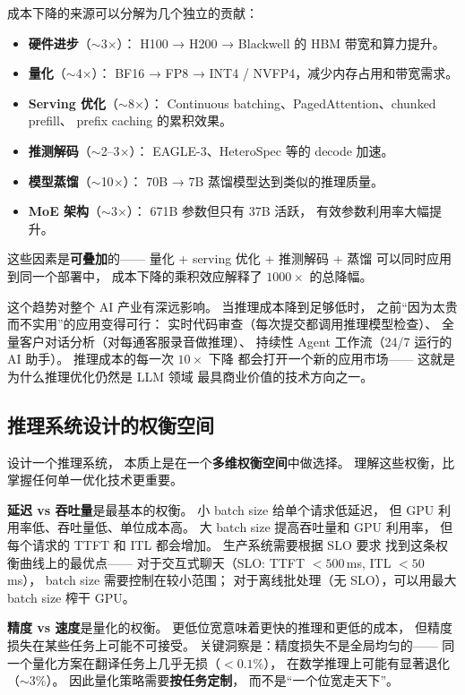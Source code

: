 成本下降的来源可以分解为几个独立的贡献：
\begin{itemize}[noitemsep]
  \item \textbf{硬件进步}（$\sim$3$\times$）：
        H100 → H200 → Blackwell 的 HBM 带宽和算力提升。
  \item \textbf{量化}（$\sim$4$\times$）：
        BF16 → FP8 → INT4 / NVFP4，减少内存占用和带宽需求。
  \item \textbf{Serving 优化}（$\sim$8$\times$）：
        Continuous batching、PagedAttention、chunked prefill、
        prefix caching 的累积效果。
  \item \textbf{推测解码}（$\sim$2--3$\times$）：
        EAGLE-3、HeteroSpec 等的 decode 加速。
  \item \textbf{模型蒸馏}（$\sim$10$\times$）：
        70B → 7B 蒸馏模型达到类似的推理质量。
  \item \textbf{MoE 架构}（$\sim$3$\times$）：
        671B 参数但只有 37B 活跃，
        有效参数利用率大幅提升。
\end{itemize}
这些因素是\textbf{可叠加}的——
量化 + serving 优化 + 推测解码 + 蒸馏
可以同时应用到同一个部署中，
成本下降的乘积效应解释了 $1000\times$ 的总降幅。

这个趋势对整个 AI 产业有深远影响。
当推理成本降到足够低时，
之前“因为太贵而不实用”的应用变得可行：
实时代码审查（每次提交都调用推理模型检查）、
全量客户对话分析（对每通客服录音做推理）、
持续性 Agent 工作流（24/7 运行的 AI 助手）。
推理成本的每一次 $10\times$ 下降
都会打开一个新的应用市场——
这就是为什么推理优化仍然是 LLM 领域
最具商业价值的技术方向之一。

\subsection{推理系统设计的权衡空间}

设计一个推理系统，
本质上是在一个\textbf{多维权衡空间}中做选择。
理解这些权衡，比掌握任何单一优化技术更重要。

\textbf{延迟 vs 吞吐量}是最基本的权衡。
小 batch size 给单个请求低延迟，
但 GPU 利用率低、吞吐量低、单位成本高。
大 batch size 提高吞吐量和 GPU 利用率，
但每个请求的 TTFT 和 ITL 都会增加。
生产系统需要根据 SLO 要求
找到这条权衡曲线上的最优点——
对于交互式聊天（SLO: TTFT $< 500$\,ms, ITL $< 50$\,ms），
batch size 需要控制在较小范围；
对于离线批处理（无 SLO），可以用最大 batch size 榨干 GPU。

\textbf{精度 vs 速度}是量化的权衡。
更低位宽意味着更快的推理和更低的成本，
但精度损失在某些任务上可能不可接受。
关键洞察是：精度损失不是全局均匀的——
同一个量化方案在翻译任务上几乎无损（$<0.1\%$），
在数学推理上可能有显著退化（$\sim$3\%）。
因此量化策略需要\textbf{按任务定制}，
而不是“一个位宽走天下”。

